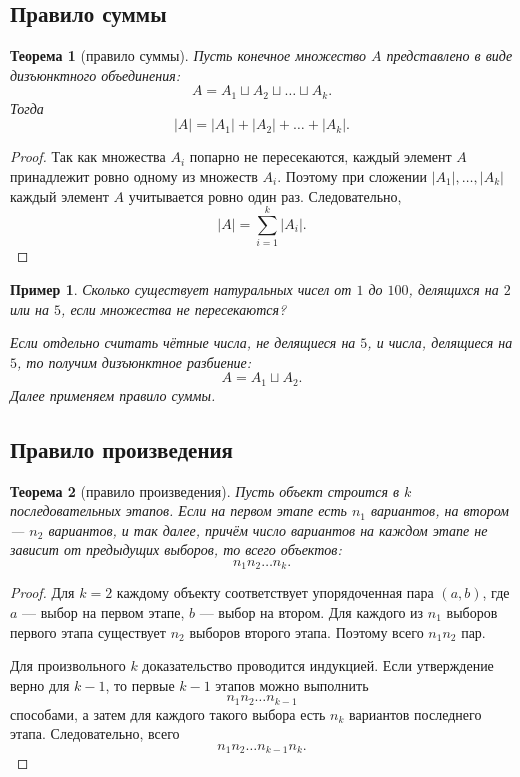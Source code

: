 \documentclass[12pt,a4paper]{article}
\newtheorem{theorem}{Теорема}
\newtheorem{example}{Пример}
\begin{document}
\subsection{Правило суммы}

\begin{theorem}[правило суммы]
Пусть конечное множество $A$ представлено в виде дизъюнктного объединения:
\[
A = A_1 \sqcup A_2 \sqcup \dots \sqcup A_k.
\]
Тогда
\[
|A| = |A_1| + |A_2| + \dots + |A_k|.
\]
\end{theorem}

\begin{proof}
Так как множества $A_i$ попарно не пересекаются, каждый элемент $A$ принадлежит ровно одному из множеств $A_i$. Поэтому при сложении $|A_1|,\dots,|A_k|$ каждый элемент $A$ учитывается ровно один раз. Следовательно,
\[
|A| = \sum_{i=1}^k |A_i|.
\]
\end{proof}

\begin{example}
Сколько существует натуральных чисел от $1$ до $100$, делящихся на $2$ или на $5$, если множества не пересекаются?

Если отдельно считать чётные числа, не делящиеся на $5$, и числа, делящиеся на $5$, то получим дизъюнктное разбиение:
\[
A = A_1 \sqcup A_2.
\]
Далее применяем правило суммы.
\end{example}

\subsection{Правило произведения}

\begin{theorem}[правило произведения]
Пусть объект строится в $k$ последовательных этапов. Если на первом этапе есть $n_1$ вариантов, на втором --- $n_2$ вариантов, и так далее, причём число вариантов на каждом этапе не зависит от предыдущих выборов, то всего объектов:
\[
n_1 n_2 \dots n_k.
\]
\end{theorem}

\begin{proof}
Для $k=2$ каждому объекту соответствует упорядоченная пара $(a,b)$, где $a$ --- выбор на первом этапе, $b$ --- выбор на втором. Для каждого из $n_1$ выборов первого этапа существует $n_2$ выборов второго этапа. Поэтому всего $n_1n_2$ пар.

Для произвольного $k$ доказательство проводится индукцией. Если утверждение верно для $k-1$, то первые $k-1$ этапов можно выполнить
\[
n_1n_2\dots n_{k-1}
\]
способами, а затем для каждого такого выбора есть $n_k$ вариантов последнего этапа. Следовательно, всего
\[
n_1n_2\dots n_{k-1}n_k.
\]
\end{proof}
\end{document}
